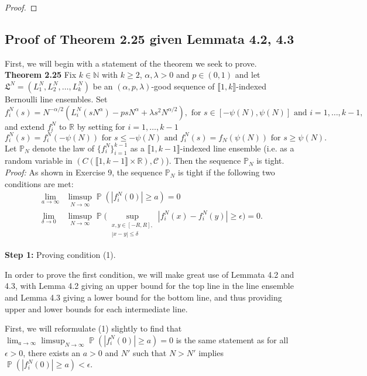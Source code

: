 \documentclass[12pt]{article}
\DeclareMathOperator{\pr}{\mathbb{P}}
\begin{document}
\begin{proof}
	\end{proof}
	
\subsection*{Proof of Theorem 2.25 given Lemmata 4.2, 4.3}
First, we will begin with a statement of the theorem we seek to prove. \\

\noindent\textbf{Theorem 2.25}
	Fix $k \in \mathbb{N}$ with $k \geq 2$, $\alpha, \lambda > 0$ and $p \in (0,1)$ and let $\mathfrak{L}^N = (L^N_1, L^N_2, \dots, L^N_k)$ be an $(\alpha, p, \lambda)$-good sequence of $\llbracket 1, k \rrbracket$-indexed Bernoulli line ensembles.  Set
	$$f^N_i(s) =  N^{-\alpha/2}(L^N_i(sN^{\alpha}) - p s N^{\alpha} + \lambda s^2 N^{\alpha/2}), \mbox{ for $s\in [-\psi(N) ,\psi(N)]$ and $i = 1,\dots, k -1$,}$$
	and extend $f^N_i$ to $\mathbb{R}$ by setting for $i = 1, \dots, k - 1$
	$$f^N_i(s) = f^N_i(-\psi(N)) \mbox{ for $s \leq -\psi(N)$ and } f^N_i(s) = f_N(\psi(N)) \mbox{ for $s \geq \psi(N)$}.$$
	Let $\mathbb{P}_N$ denote the law of $\{f^N_i\}_{i = 1}^{k-1}$ as a $\llbracket 1, k-1 \rrbracket$-indexed line ensemble (i.e. as a random variable in $(C( \llbracket 1, k -1 \rrbracket \times \mathbb{R}), \mathcal{C})$). Then the sequence $\mathbb{P}_N$ is tight.\\

\noindent \textit{Proof:} As shown in Exercise 9, the sequence $\mathbb{P}_N$ is tight if the following two conditions are met:
\begin{align}
\lim_{a\to\infty} &\limsup_{N\to\infty} \pr(|f^N_i(0)|\geq a) = 0\\
\lim_{\delta\to 0} &\limsup_{N\to\infty} \pr\bigg(\sup_{\substack{x,y\in [-R,R], \\ |x-y|\leq\delta}} |f^N_i(x) - f^N_i(y)| \geq \epsilon\bigg)= 0.
\end{align}

\noindent \textbf{Step 1:} Proving condition (1).

In order to prove the first condition, we will make great use of Lemmata 4.2 and 4.3, with Lemma 4.2 giving an upper bound for the top line in the line ensemble and Lemma 4.3 giving a lower bound for the bottom line, and thus providing upper and lower bounds for each intermediate line.

First, we will reformulate (1) slightly to find that $\lim_{a\to\infty}\limsup_{N\to\infty} \pr(|f^N_i(0)|\geq a)=0$ is the same statement as for all $\epsilon>0$, there exists an $a>0$ and $N'$ such that $N>N'$ implies $\pr(|f^N_i(0)|\geq a)<\epsilon$. 
\end{document}
